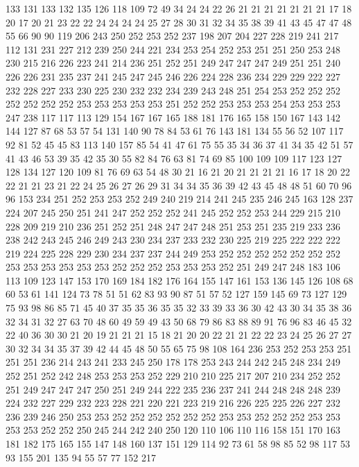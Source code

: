 133 131 133 132 135 126 118 109 72 49 34 24 24 22 26 21 21 21 21 21
21 21 17 18 20 17 20 21 23 22 22 24 24 24 24 25 27 28 30 31
32 34 35 38 39 41 43 45 47 47 48 55 66 90 90 119 206 243 250 252
253 252 237 198 207 204 227 228 219 241 217 112 131 231 227 212 239 250 244 221
234 253 254 252 253 251 251 250 253 248 230 215 216 226 223 241 214 236 251 252
251 249 247 247 247 249 251 251 240 226 226 231 235 237 241 245 247 245 246 226
224 228 236 234 229 229 222 227 232 228 227 233 230 225 230 232 232 234 239 243
248 251 254 253 252 252 252 252 252 252 252 253 253 253 253 253 251 252 252 253
253 253 254 253 253 253 247 238 117 117 113 129 154 167 167 165 188 181 176 165
158 150 167 143 142 144 127 87 68 53 57 54 131 140 90 78 84 53 61 76
143 181 134 55 56 52 107 117 92 81 52 45 45 83 113 140 157 85 54 41
47 61 75 55 35 34 36 37 41 34 35 42 51 57 41 43 46 53 39 35
42 35 30 55 82 84 76 63 81 74 69 85 100 109 109 117 123 127 128 134
127 120 109 81 76 69 63 54 48 30 21 16 21 20 21 21 21 21 16 17
18 20 22 22 21 21 23 21 22 24 25 26 27 26 29 31 34 34 35 36
39 42 43 45 48 48 51 60 70 96 96 153 234 251 252 253 253 252 249 240
219 214 241 245 235 246 245 163 128 237 224 207 245 250 251 241 247 252 252 252
241 245 252 252 253 244 229 215 210 228 209 219 210 236 251 252 251 248 247 247
248 251 253 251 235 219 233 236 238 242 243 245 246 249 243 230 234 237 233 232
230 225 219 225 222 222 222 219 224 225 228 229 230 234 237 237 244 249 253 252
252 252 252 252 252 252 253 253 253 253 253 253 252 252 252 253 253 253 252 251
249 247 248 183 106 113 109 123 147 153 170 169 184 182 176 164 155 147 161 153
136 145 126 108 68 60 53 61 141 124 73 78 51 51 62 83 93 90 87 51
57 52 127 159 145 69 73 127 129 75 93 98 86 85 71 45 40 37 35 35
36 35 35 32 33 39 33 36 30 42 43 30 34 35 38 36 32 34 31 32
27 63 70 48 60 49 59 49 43 50 68 79 86 83 88 89 91 76 96 83
46 45 32 22 40 36 30 30 21 20 19 21 21 21 15 18 21 20 20 22
21 21 22 22 23 24 25 26 27 27 30 32 34 34 35 37 39 42 44 45
48 50 55 65 75 98 108 164 236 253 252 253 253 251 251 251 236 214 243 241
233 245 250 178 178 253 243 244 242 245 248 234 249 252 251 252 242 248 253 253
253 252 229 210 210 225 217 207 210 234 252 252 251 249 247 247 247 250 251 249
244 222 235 236 237 241 244 248 248 248 239 224 232 227 229 232 223 228 221 220
221 223 219 216 226 225 225 226 227 232 236 239 246 250 253 253 252 252 252 252
252 252 253 253 252 252 252 253 253 253 253 252 252 250 245 244 242 240 250 120
110 106 110 116 158 151 170 163 181 182 175 165 155 147 148 160 137 151 129 114
92 73 61 58 98 85 52 98 117 53 93 155 201 135 94 55 57 77 152 217
